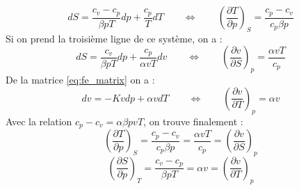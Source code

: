 \begin{equation} dS = \frac{c_v-c_p}{\beta pT}dp + \frac{c_p}{T}dT \qquad \Leftrightarrow \qquad \left(\frac{\partial T}{\partial p}\right)_S = \frac{c_p-c_v}{c_p\beta p} \end{equation}
Si on prend la troisième ligne de ce système, on a :
\begin{equation} dS = \frac{c_v}{\beta pT}dp + \frac{c_p}{\alpha vT}dv \qquad \Leftrightarrow \qquad \left(\frac{\partial v}{\partial S}\right)_p = \frac{\alpha vT}{c_p} \end{equation}
De la matrice \ref{eq:fe_matrix} on a :
\begin{equation} dv = -Kv dp + \alpha v dT \qquad \Leftrightarrow \qquad \left(\frac{\partial v}{\partial T}\right)_p = \alpha v \end{equation}
Avec la relation $c_p-c_v = \alpha\beta pvT$, on trouve finalement :
\begin{equation} \left(\frac{\partial T}{\partial p}\right)_S = \frac{c_p-c_v}{c_p\beta p} = \frac{\alpha vT}{c_p} = \left(\frac{\partial v}{\partial S}\right)_p \end{equation}
\begin{equation} \left(\frac{\partial S}{\partial p}\right)_T = \frac{c_v-c_p}{\beta pT} = \alpha v = \left(\frac{\partial v}{\partial T}\right)_p \end{equation}

